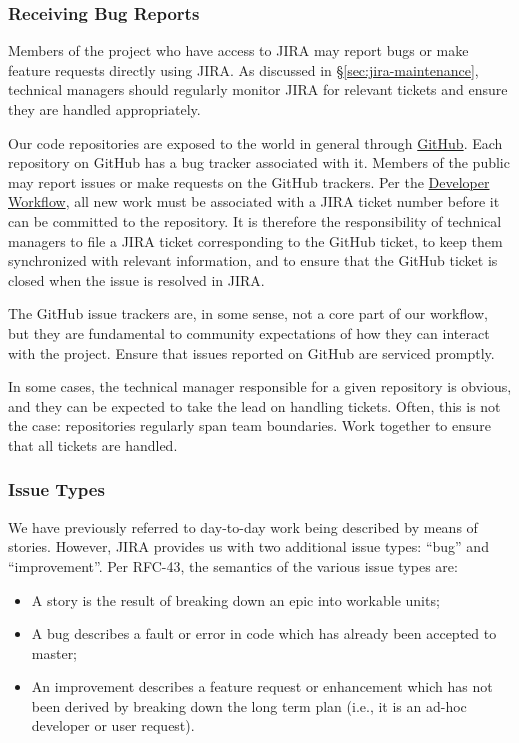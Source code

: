 \subsubsection{Receiving Bug Reports}\label{receiving-bug-reports}

Members of the project who have access to JIRA may report bugs or make feature requests directly using JIRA.
As discussed in \S\ref{sec:jira-maintenance}, technical managers should regularly monitor JIRA for relevant tickets and ensure they are handled appropriately.

Our code repositories are exposed to the world in general through
\href{https://github.com/lsst/}{GitHub}. Each repository on GitHub has a
bug tracker associated with it. Members of the public may report issues
or make requests on the GitHub trackers. Per the
\href{https://developer.lsst.io/processes/workflow.html}{Developer
Workflow}, all new work must be associated with a JIRA ticket number
before it can be committed to the repository. It is therefore the
responsibility of technical managers to file a JIRA ticket corresponding
to the GitHub ticket, to keep them synchronized with relevant
information, and to ensure that the GitHub ticket is closed when the
issue is resolved in JIRA.

The GitHub issue trackers are, in some sense, not a core part of our
workflow, but they are fundamental to community expectations of how they
can interact with the project. Ensure that issues reported on GitHub are
serviced promptly.

In some cases, the technical manager responsible for a given repository
is obvious, and they can be expected to take the lead on handling
tickets. Often, this is not the case: repositories regularly span team
boundaries. Work together to ensure that all tickets are handled.

\subsubsection{Issue Types}\label{issue-types}

We have previously referred to day-to-day work being described by means
of stories. However, JIRA provides us with two additional issue types:
``bug'' and ``improvement''. Per RFC-43, the semantics of the various
issue types are:

\begin{itemize}
\item
  A story is the result of breaking down an epic into workable units;
\item
  A bug describes a fault or error in code which has already been
  accepted to master;
\item
  An improvement describes a feature request or enhancement which has
  not been derived by breaking down the long term plan (i.e., it is an
  ad-hoc developer or user request).
\end{itemize}

